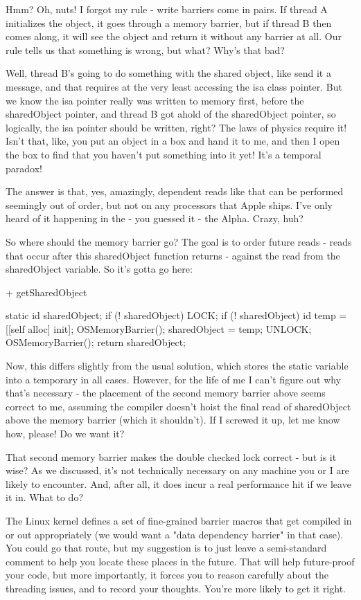 {{{{Hmm? Oh, nuts! I forgot my rule - write barriers come in pairs. If thread A initializes the object, it goes through a memory barrier, but if thread B then comes along, it will see the object and return it without any barrier at all. Our rule tells us that something is wrong, but what? Why's that bad?

Well, thread B's going to do something with the shared object, like send it a message, and that requires at the very least accessing the isa class pointer. But we know the isa pointer really was written to memory first, before the sharedObject pointer, and thread B got ahold of the sharedObject pointer, so logically, the isa pointer should be written, right? The laws of physics require it! Isn't that, like, you put an object in a box and hand it to me, and then I open the box to find that you haven't put something into it yet! It's a temporal paradox!

The answer is that, yes, amazingly, dependent reads like that can be performed seemingly out of order, but not on any processors that Apple ships. I've only heard of it happening in the - you guessed it - the Alpha. Crazy, huh?

So where should the memory barrier go? The goal is to order future reads - reads that occur after this sharedObject function returns - against the read from the sharedObject variable. So it's gotta go here:

+ getSharedObject {
    static id sharedObject;
    if (! sharedObject) {
        LOCK;
        if (! sharedObject) {
            id temp = [[self alloc] init];
            OSMemoryBarrier();
            sharedObject = temp;
        }
        UNLOCK;
    }
    OSMemoryBarrier();
    return sharedObject;

Now, this differs slightly from the usual solution, which stores the static variable into a temporary in all cases. However, for the life of me I can't figure out why that's necessary - the placement of the second memory barrier above seems correct to me, assuming the compiler doesn't hoist the final read of sharedObject above the memory barrier (which it shouldn't). If I screwed it up, let me know how, please!
Do we want it?

That second memory barrier makes the double checked lock correct - but is it wise? As we discussed, it's not technically necessary on any machine you or I are likely to encounter. And, after all, it does incur a real performance hit if we leave it in. What to do?

The Linux kernel defines a set of fine-grained barrier macros that get compiled in or out appropriately (we would want a "data dependency barrier" in that case). You could go that route, but my suggestion is to just leave a semi-standard comment to help you locate these places in the future. That will help future-proof your code, but more importantly, it forces you to reason carefully about the threading issues, and to record your thoughts. You're more likely to get it right.

}}}}}
